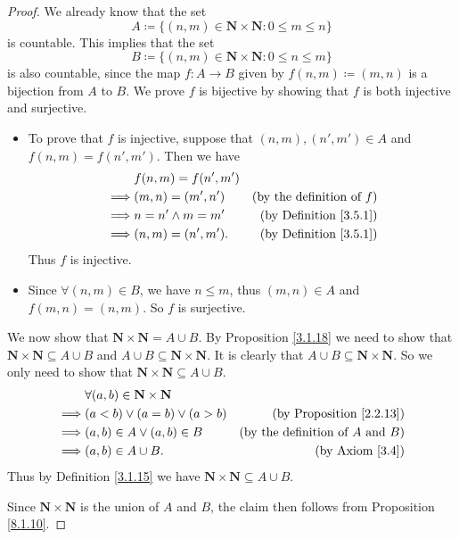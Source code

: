 \begin{proof}
    We already know that the set
    \[
        A \coloneqq \{(n, m) \in \mathbf{N} \times \mathbf{N} : 0 \leq m \leq n\}
    \]
    is countable.
    This implies that the set
    \[
        B \coloneqq \{(n, m) \in \mathbf{N} \times \mathbf{N} : 0 \leq n \leq m\}
    \]
    is also countable, since the map \(f : A \to B\) given by \(f(n, m) \coloneqq (m, n)\) is a bijection from \(A\) to \(B\).
    We prove \(f\) is bijective by showing that \(f\) is both injective and surjective.
    \begin{itemize}
        \item To prove that \(f\) is injective, suppose that \((n, m), (n', m') \in A\) and \(f(n, m) = f(n', m')\).
              Then we have
              \begin{align*}
                           & f(n, m) = f(n', m')                                       \\
                  \implies & (m, n) = (m', n')   & \text{(by the definition of \(f\))} \\
                  \implies & n = n' \land m = m' & \text{(by Definition \ref{3.5.1})}  \\
                  \implies & (n, m) = (n', m').  & \text{(by Definition \ref{3.5.1})}
              \end{align*}
              Thus \(f\) is injective.
        \item Since \(\forall (n, m) \in B\), we have \(n \leq m\), thus \((m, n) \in A\) and \(f(m, n) = (n, m)\).
              So \(f\) is surjective.
    \end{itemize}

    We now show that \(\mathbf{N} \times \mathbf{N} = A \cup B\).
    By Proposition \ref{3.1.18} we need to show that \(\mathbf{N} \times \mathbf{N} \subseteq A \cup B\) and \(A \cup B \subseteq \mathbf{N} \times \mathbf{N}\).
    It is clearly that \(A \cup B \subseteq \mathbf{N} \times \mathbf{N}\).
    So we only need to show that \(\mathbf{N} \times \mathbf{N} \subseteq A \cup B\).
    \begin{align*}
                 & \forall (a, b) \in \mathbf{N} \times \mathbf{N}                                                 \\
        \implies & (a < b) \lor (a = b) \lor (a > b)               & \text{(by Proposition \ref{2.2.13})}          \\
        \implies & (a, b) \in A \lor (a, b) \in B                  & \text{(by the definition of \(A\) and \(B\))} \\
        \implies & (a, b) \in A \cup B.                            & \text{(by Axiom \ref{3.4})}
    \end{align*}
    Thus by Definition \ref{3.1.15} we have \(\mathbf{N} \times \mathbf{N} \subseteq A \cup B\).

    Since \(\mathbf{N} \times \mathbf{N}\) is the union of \(A\) and \(B\), the claim then follows from Proposition \ref{8.1.10}.
\end{proof}

